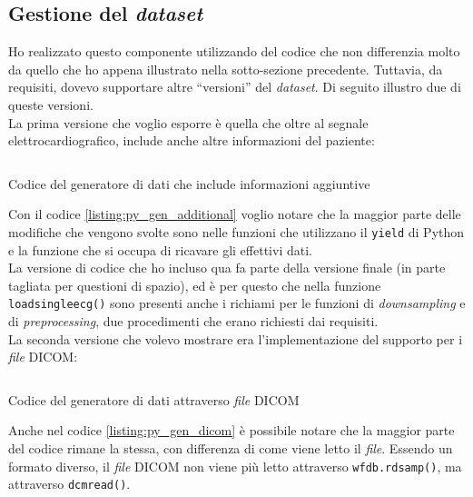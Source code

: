 \subsection{Gestione del \textit{dataset}}\noindent
Ho realizzato questo componente utilizzando del codice che non differenzia molto da quello che ho appena illustrato nella sotto-sezione precedente.
Tuttavia, da requisiti, dovevo supportare altre ``versioni'' del \textit{dataset}. Di seguito illustro due di queste versioni.\\
La prima versione che voglio esporre è quella che oltre al segnale elettrocardiografico, include anche altre informazioni del paziente:
\begin{listing}[H]
    \inputminted{python}{code/generator_additional.py}
    \caption{Codice del generatore di dati che include informazioni aggiuntive}
    \label{listing:py_gen_additional}
\end{listing}\noindent
Con il codice \ref{listing:py_gen_additional} voglio notare che la maggior parte delle modifiche che vengono svolte sono nelle funzioni che utilizzano il \texttt{yield} di Python e la funzione che si occupa di ricavare gli effettivi dati.\\
La versione di codice che ho incluso qua fa parte della versione finale (in parte tagliata per questioni di spazio), ed è per questo che nella funzione \texttt{\textunderscore load\textunderscore single\textunderscore ecg()} sono presenti anche i richiami per le funzioni di \textit{downsampling} e di \textit{preprocessing}, due procedimenti che erano richiesti dai requisiti.\\
La seconda versione che volevo mostrare era l'implementazione del supporto per i \textit{file} DICOM:
\begin{listing}[H]
    \inputminted{python}{code/generator_dicom.py}
    \caption{Codice del generatore di dati attraverso \textit{file} DICOM}
    \label{listing:py_gen_dicom}
\end{listing}\noindent
Anche nel codice \ref{listing:py_gen_dicom} è possibile notare che la maggior parte del codice rimane la stessa, con differenza di come viene letto il \textit{file}. Essendo un formato diverso, il \textit{file} DICOM non viene più letto attraverso \texttt{wfdb.rdsamp()}, ma attraverso \texttt{dcmread()}.

